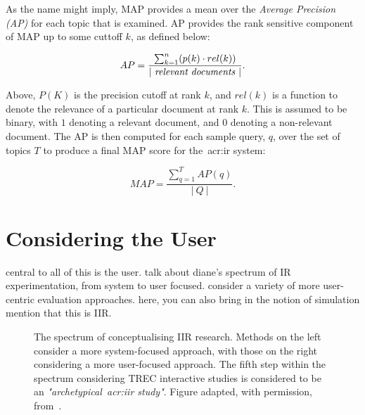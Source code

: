 As the name might imply, MAP provides a mean over the \emph{Average Precision (AP)} for each topic that is examined. AP provides the rank sensitive component of MAP up to some cuttoff $k$, as defined below:

\begin{equation*}
AP = \frac{\sum^{n}_{k=1}(p(k) \cdot rel(k))}{|~\text{\emph{relevant documents}}~|}.
\end{equation*}

Above, $P(K)$ is the precision cutoff at rank $k$, and $rel(k)$ is a function to denote the relevance of a particular document at rank $k$. This is assumed to be binary, with $1$ denoting a relevant document, and $0$ denoting a non-relevant document. The AP is then computed for each sample query, $q$, over the set of topics $T$ to produce a final MAP score for the~\gls{acr:ir} system:

\begin{equation*}
MAP = \frac{\sum^{T}_{q=1} AP(q)}{|~Q~|}.
\end{equation*}


\section{Considering the User}\label{sec:ir_background:user}
central to all of this is the user.
talk about diane's spectrum of IR experimentation, from system to user focused.
consider a variety of more user-centric evaluation approaches.
here, you can also bring in the notion of simulation
mention that this is IIR.

\begin{figure}[t!]
    \centering
    \caption[The spectrum of conceptualising IIR research~\citep{kelly2009iir}]{The spectrum of conceptualising IIR research. Methods on the left consider a more system-focused approach, with those on the right considering a more user-focused approach. The fifth step within the spectrum considering TREC interactive studies is considered to be an \emph{"archetypical~\gls{acr:iir} study"}. Figure adapted, with permission, from~\cite{kelly2009iir}.}
    \label{fig:spectrum}
\end{figure}

